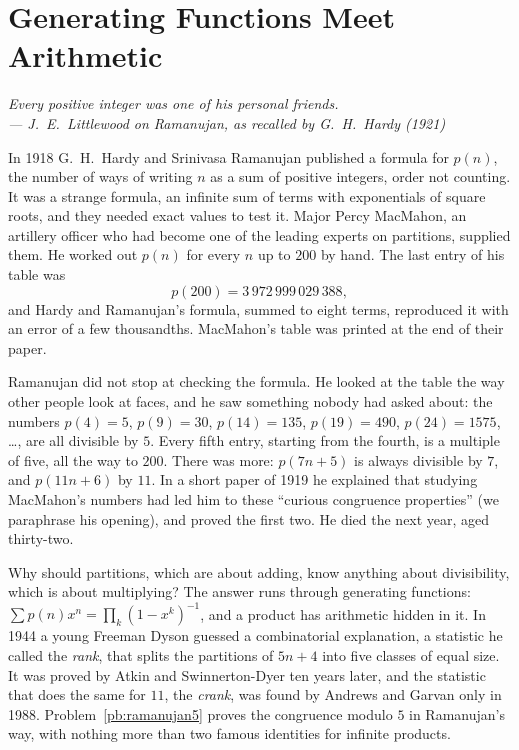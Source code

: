 \chapter{Generating Functions Meet Arithmetic}

\begin{center}\itshape
Every positive integer was one of his personal friends.\\
\upshape --- J.~E.~Littlewood on Ramanujan, as recalled by G.~H.~Hardy (1921)
\end{center}

In 1918 G.~H.~Hardy and Srinivasa Ramanujan published a formula for $p(n)$, the number of ways of writing $n$ as a sum of
positive integers, order not counting. It was a strange formula, an infinite sum of terms with exponentials of square roots,
and they needed exact values to test it. Major Percy MacMahon, an artillery officer who had become one of the leading
experts on partitions, supplied them. He worked out $p(n)$ for every $n$ up to $200$ by hand. The last entry of his
table was
\[
p(200)=3\,972\,999\,029\,388,
\]
and Hardy and Ramanujan's formula, summed to eight terms, reproduced it with an error of a few thousandths. MacMahon's table
was printed at the end of their paper.

Ramanujan did not stop at checking the formula. He looked at the table the way other people look at faces, and he saw
something nobody had asked about: the numbers $p(4)=5$, $p(9)=30$, $p(14)=135$, $p(19)=490$, $p(24)=1575$, \dots, are all
divisible by $5$. Every fifth entry, starting from the fourth, is a multiple of five, all the way to $200$. There was more:
$p(7n+5)$ is always divisible by $7$, and $p(11n+6)$ by $11$. In a short paper of 1919 he explained that studying
MacMahon's numbers had led him to these ``curious congruence properties'' (we paraphrase his opening), and proved the first
two. He died the next year, aged thirty-two.

Why should partitions, which are about adding, know anything about divisibility, which is about multiplying? The answer runs
through generating functions: $\sum p(n)x^n=\prod_k(1-x^k)^{-1}$, and a product has arithmetic hidden in it. In 1944 a young
Freeman Dyson guessed a combinatorial explanation, a statistic he called the \emph{rank}, that splits the partitions of $5n+4$
into five classes of equal size. It was proved by Atkin and Swinnerton-Dyer ten years later, and the statistic that does the
same for $11$, the \emph{crank}, was found by Andrews and Garvan only in 1988. Problem~\ref{pb:ramanujan5} proves the congruence
modulo $5$ in Ramanujan's way, with nothing more than two famous identities for infinite products.


